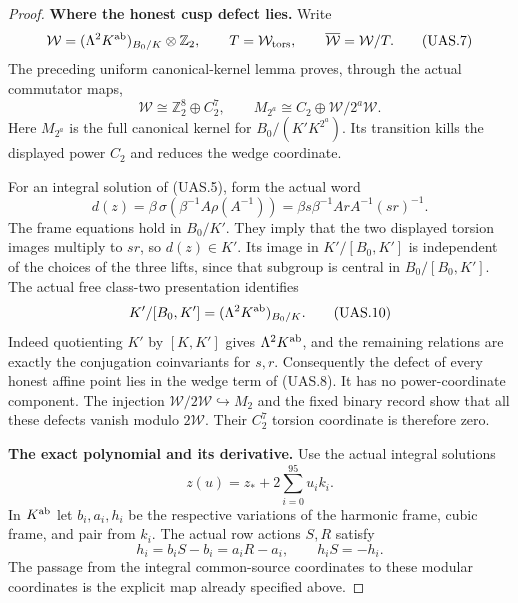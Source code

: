 \begin{proof}
\par\medskip\noindent\textbf{Where the honest cusp defect lies.}\quad
Write
\[
 \mathcal W=(\Lambda^2 K^{\rm ab})_{B_0/K}\otimes\mathbb Z_2,
 \qquad T=\mathcal W_{\rm tors},\qquad
 \overline{\mathcal W}=\mathcal W/T.
                                                                    \tag{UAS.7}
\]
The preceding uniform canonical-kernel lemma proves, through the
actual commutator maps,
\[
 \mathcal W\cong\mathbb Z_2^8\oplus C_2^7,
 \qquad
 M_{2^a}\cong C_2\oplus\mathcal W/2^a\mathcal W.
                                                                    \tag{UAS.8}
\]
Here $M_{2^a}$ is the full canonical kernel for
$B_0/(K'K^{2^a})$.  Its transition kills the displayed power
$C_2$ and reduces the wedge coordinate.

For an integral solution of (UAS.5), form the actual word
\[
 d(z)=\beta\,\sigma\!\left(\beta^{-1}A\rho(A^{-1})\right)
     =\beta s\beta^{-1}ArA^{-1}(sr)^{-1}.                          \tag{UAS.9}
\]
The frame equations hold in $B_0/K'$.  They imply that the two
displayed torsion images multiply to $sr$, so $d(z)\in K'$.
Its image in $K'/[B_0,K']$ is independent of the choices of the
three lifts, since that subgroup is central in
$B_0/[B_0,K']$.
The actual free class-two presentation identifies
\[
 K'/[B_0,K']=(\Lambda^2K^{\rm ab})_{B_0/K}.                         \tag{UAS.10}
\]
Indeed quotienting $K'$ by $[K,K']$ gives $\Lambda^2K^{\rm ab}$,
and the remaining relations are exactly the conjugation
coinvariants for $s,r$.
Consequently the defect of every honest affine point lies in the
wedge term of (UAS.8).  It has no power-coordinate component.
The injection $\mathcal W/2\mathcal W\hookrightarrow M_2$ and
the fixed binary record show that all these defects vanish modulo
$2\mathcal W$.  Their $C_2^7$ torsion coordinate is therefore zero.

\par\medskip\noindent\textbf{The exact polynomial and its derivative.}\quad
Use the actual integral solutions
\[
               z(u)=z_*+2\sum_{i=0}^{95}u_i k_i.                  \tag{UAS.11}
\]
In $K^{\rm ab}$ let $b_i,a_i,h_i$ be the respective variations of
the harmonic frame, cubic frame, and pair from $k_i$.
The actual row actions $S,R$ satisfy
\[
       h_i=b_iS-b_i=a_iR-a_i,
       \qquad h_iS=-h_i.                                        \tag{UAS.12}
\]
The passage from the integral common-source coordinates to these
modular coordinates is the explicit map already specified above.


\end{proof}
